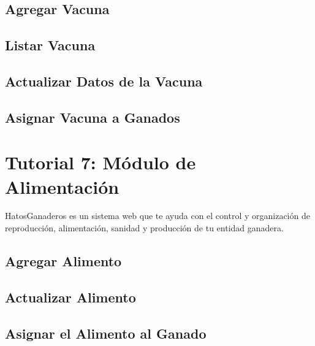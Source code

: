 \documentclass[letterpaper,10pt,spanish]{sphinxmanual}
\begin{document}
\subsection{Agregar Vacuna}
\label{Tutorial 6: M_xf3dulo de Sanidad:agregar-vacuna}

\subsection{Listar Vacuna}
\label{Tutorial 6: M_xf3dulo de Sanidad:listar-vacuna}

\subsection{Actualizar Datos de la Vacuna}
\label{Tutorial 6: M_xf3dulo de Sanidad:actualizar-datos-de-la-vacuna}

\subsection{Asignar Vacuna a Ganados}
\label{Tutorial 6: M_xf3dulo de Sanidad:asignar-vacuna-a-ganados}

\section{Tutorial 7: Módulo de Alimentación}
\label{Tutorial 7: M_xf3dulo de Alimentaci_xf3n:tutorial-7-modulo-de-alimentacion}\label{Tutorial 7: M_xf3dulo de Alimentaci_xf3n::doc}
HatosGanaderos es un sistema web que te ayuda con el control y organización de reproducción, alimentación, sanidad y producción de tu entidad ganadera.


\subsection{Agregar Alimento}
\label{Tutorial 7: M_xf3dulo de Alimentaci_xf3n:agregar-alimento}

\subsection{Actualizar Alimento}
\label{Tutorial 7: M_xf3dulo de Alimentaci_xf3n:actualizar-alimento}

\subsection{Asignar el Alimento al Ganado}
\label{Tutorial 7: M_xf3dulo de Alimentaci_xf3n:asignar-el-alimento-al-ganado}
\end{document}
